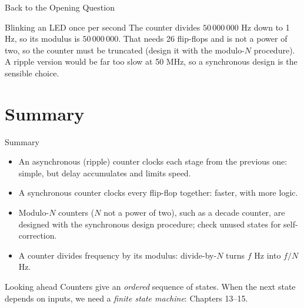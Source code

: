 \documentclass[9pt,aspectratio=169,xcolor=table]{beamer}
\begin{document}
\begin{frame}{Back to the Opening Question}
  \begin{block}{Blinking an LED once per second}
    \small The counter divides $50\,000\,000$ Hz down to 1 Hz, so its modulus is $50\,000\,000$. That needs 26 flip-flops and is not a power of two, so the counter must be truncated (design it with the modulo-$N$ procedure). A ripple version would be far too slow at 50 MHz, so a synchronous design is the sensible choice.
  \end{block}
\end{frame}

\section{Summary}

\begin{frame}{Summary}
  \begin{itemize}\itemsep3pt\small
    \item An \alert{asynchronous (ripple) counter} clocks each stage from the previous one: simple, but delay accumulates and limits speed.
    \item A \alert{synchronous counter} clocks every flip-flop together: faster, with more logic.
    \item Modulo-$N$ counters ($N$ not a power of two), such as a decade counter, are designed with the synchronous design procedure; check unused states for self-correction.
    \item A counter divides frequency by its modulus: divide-by-$N$ turns $f$ Hz into $f/N$ Hz.
  \end{itemize}
  \begin{block}{Looking ahead}
    Counters give an \emph{ordered} sequence of states. When the next state depends on inputs, we need a \emph{finite state machine}: Chapters 13--15.
  \end{block}
\end{frame}
\end{document}
